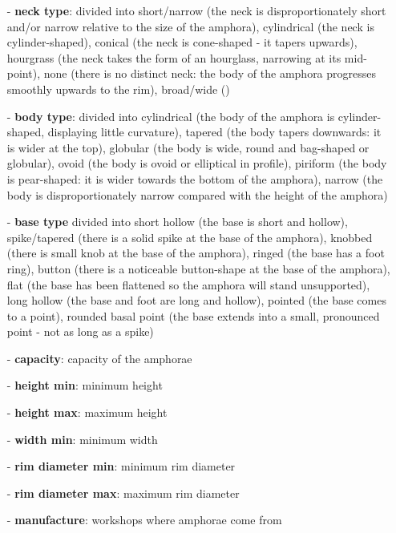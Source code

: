 \documentclass[10pt,a4paper]{article}
\begin{document}
\begin{itemize}
\item[-] \textbf{neck type}: divided into short/narrow (the neck is disproportionately short and/or narrow relative to the size of the amphora), cylindrical (the neck is cylinder-shaped), conical (the neck is cone-shaped - it tapers upwards), hourgrass (the neck takes the form of an hourglass, narrowing at its mid-point), none (there is no distinct neck: the body of the amphora progresses smoothly upwards to the rim), broad/wide ()

\item[-] \textbf{body type}: divided into cylindrical (the body of the amphora is cylinder-shaped, displaying little curvature), tapered (the body tapers downwards: it is wider at the top), globular (the body is wide, round and bag-shaped or globular), ovoid (the body is ovoid or elliptical in profile), piriform (the body is pear-shaped: it is wider towards the bottom of the amphora), narrow (the body is disproportionately narrow compared with the height of the amphora)

\item[-] \textbf{base type} divided into short hollow (the base is short and hollow), spike/tapered (there is a solid spike at the base of the amphora), knobbed (there is small knob at the base of the amphora), ringed (the base has a foot ring), button (there is a noticeable button-shape at the base of the amphora), flat (the base has been flattened so the amphora will stand unsupported), long hollow (the base and foot are long and hollow), pointed (the base comes to a point), rounded basal point (the base extends into a small, pronounced point - not as long as a spike)

\item[-] \textbf{capacity}: capacity of the amphorae

\item[-] \textbf{height min}: minimum height

\item[-] \textbf{height max}: maximum height

\item[-] \textbf{width min}: minimum width

\item[-] \textbf{rim diameter min}: minimum rim diameter

\item[-] \textbf{rim diameter max}: maximum rim diameter

\item[-] \textbf{manufacture}: workshops where amphorae come from

\end{itemize}
\end{document}

